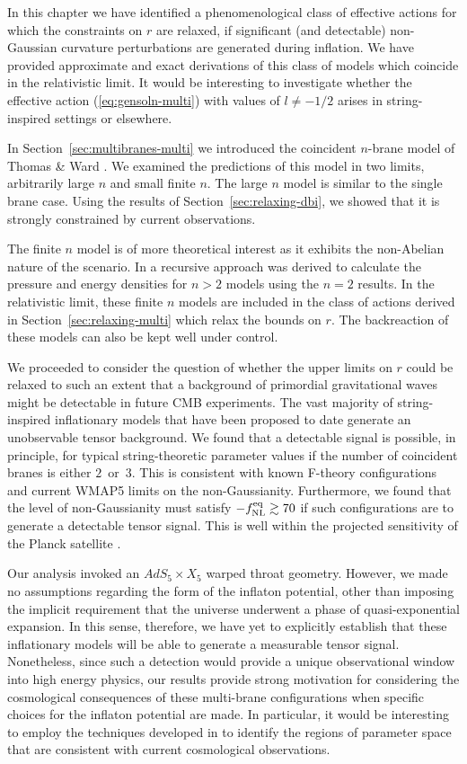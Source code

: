 In this chapter we have identified a phenomenological class of 
effective actions for which the constraints 
on $r$ are relaxed, if significant (and detectable) 
non-Gaussian curvature perturbations are generated during inflation. 
We have provided approximate and exact derivations of this class of models which coincide
in the relativistic limit. It would be interesting to 
investigate whether the effective action (\ref{eq:gensoln-multi}) with values
of $l \ne - 1/2$ arises in string-inspired settings or elsewhere.

In Section~\ref{sec:multibranes-multi} we introduced the coincident $n$-brane
model of Thomas \& Ward \cite{thomasward}. We examined the predictions of this
model in two limits, arbitrarily large $n$ and small finite $n$. The large $n$
model
is similar to the single brane case. Using the results of
Section~\ref{sec:relaxing-dbi}, we showed that it is strongly
constrained by current observations.

The finite $n$ model is of more theoretical interest as it exhibits the
non-Abelian nature of the scenario. In  a recursive approach was
derived to calculate the pressure and energy densities for $n>2$ models using
the $n=2$ results. In the relativistic limit, these finite $n$ models are
included in the class of actions derived in Section~\ref{sec:relaxing-multi}
which relax the bounds on $r$. The backreaction of these models can also be
kept well under control.

We proceeded to consider the question of whether the upper limits on 
$r$ could be relaxed to such an extent 
that a background of primordial gravitational waves 
might be detectable in future CMB experiments. The vast majority of 
string-inspired inflationary models that have been proposed to date 
generate an unobservable tensor background. We 
found that a detectable signal is possible, in principle, 
for typical string-theoretic parameter values 
if the number of coincident branes is either $2$~or~$3$. 
This is consistent with known F-theory configurations and 
current WMAP5 limits on the non-Gaussianity. Furthermore, 
we found that the level of non-Gaussianity must satisfy $-f_{\mathrm{NL}}^{\mathrm{eq}} 
\gtrsim 70$ if such configurations are to generate a detectable tensor 
signal. This is well within the projected sensitivity 
of the Planck satellite \cite{planck}.   


Our analysis invoked an $AdS_5 \times X_5$ warped throat geometry. However, we 
made no assumptions regarding the form of the inflaton potential, other 
than imposing the implicit requirement that the universe underwent a phase of 
quasi-exponential expansion. In this sense, therefore, we have 
yet to explicitly establish that these inflationary models will 
be able to generate a measurable tensor signal. 
Nonetheless, since such a detection would provide a unique observational 
window into high energy physics, our results 
provide strong motivation for considering the cosmological consequences 
of these multi-brane configurations when specific choices for the 
inflaton potential are made. In particular, it would be interesting 
to employ the techniques developed in
to identify the regions of parameter space that are consistent 
with current cosmological observations.  

